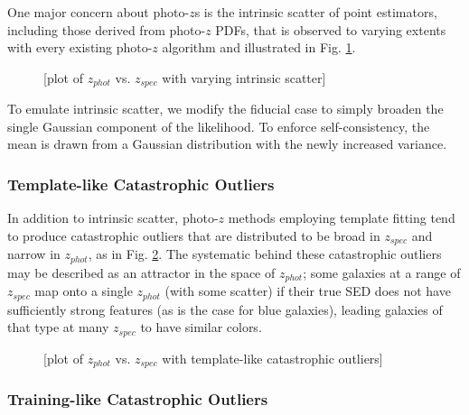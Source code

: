 \documentclass[iop]{emulateapj}
\begin{document}
One major concern about photo-$z$s is the intrinsic scatter of point 
estimators, including those derived from photo-$z$ PDFs, that is observed to 
varying extents with every existing photo-$z$ algorithm and illustrated in Fig. 
\ref{fig:intscat}.  

\begin{figure}
	\begin{center}
		\caption{[plot of $z_{phot}$ vs. $z_{spec}$ with varying 
intrinsic scatter]}
		\label{fig:intscat}
	\end{center}
\end{figure}

To emulate intrinsic scatter, we modify the fiducial case to simply broaden the 
single Gaussian component of the likelihood.  To enforce self-consistency, the 
mean is drawn from a Gaussian distribution with the newly increased variance.

\subsubsection{Template-like Catastrophic Outliers}
\label{sec:tempcatout}

In addition to intrinsic scatter, photo-$z$ methods employing template fitting 
tend to produce catastrophic outliers that are distributed to be broad in 
$z_{spec}$ and narrow in $z_{phot}$, as in Fig. \ref{fig:tempcatout}.  The 
systematic behind these catastrophic outliers may be described as an attractor 
in the space of $z_{phot}$; some galaxies at a range of $z_{spec}$ map onto a 
single $z_{phot}$ (with some scatter) if their true SED does not have 
sufficiently strong features (as is the case for blue galaxies), leading 
galaxies of that type at many $z_{spec}$ to have similar colors.

\begin{figure}
	\begin{center}
		\caption{[plot of $z_{phot}$ vs. $z_{spec}$ with template-like 
catastrophic outliers]}
		\label{fig:tempcatout}
	\end{center}
\end{figure}

\subsubsection{Training-like Catastrophic Outliers}
\label{sec:traincatout}
\end{document}
